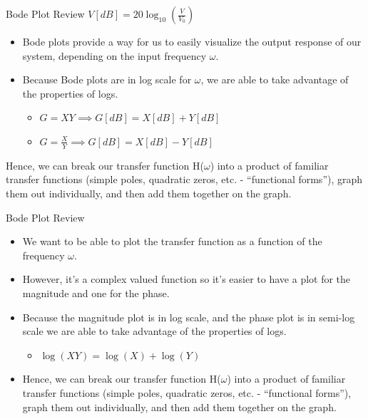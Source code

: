    \begin{frame}{Bode Plot Review}
        $V[dB] = 20\log_{10}(\frac{V}{V_0})$
        \begin{itemize}
            \item Bode plots provide a way for us to easily visualize the output response of our system, depending on the input frequency $\omega$. 
            \item Because Bode plots are in log scale for $\omega$, we are able to take advantage of the properties of logs.
            \begin{itemize}
                \item $G = XY \implies G[dB] = X[dB] + Y[dB]$
                \item $G = \frac{X}{Y} \implies G[dB] = X[dB] - Y[dB]$
            \end{itemize}
        \end{itemize}
        Hence, we can break our transfer function H($\omega$) into a product of familiar transfer functions (simple poles, quadratic zeros, etc. - “functional forms”), graph them out individually, and then add them together on the graph.  
    \end{frame}
    \begin{frame}{Bode Plot Review}
        \begin{itemize}
            \item We want to be able to plot the transfer function as a function of the frequency $\omega$. 
            \item However, it’s a complex valued function so it’s easier to have a plot for the magnitude and one for the phase. 
            \item Because the magnitude plot is in log scale, and the phase plot is in semi-log scale we are able to take advantage of the properties of logs. 
            \begin{itemize}
                \item $\log(XY) = \log(X) + \log(Y)$
            \end{itemize}
            \item Hence, we can break our transfer function H($\omega$) into a product of familiar transfer functions (simple poles, quadratic zeros, etc. - “functional forms”), graph them out individually, and then add them together on the graph.
        \end{itemize}
    \end{frame}
